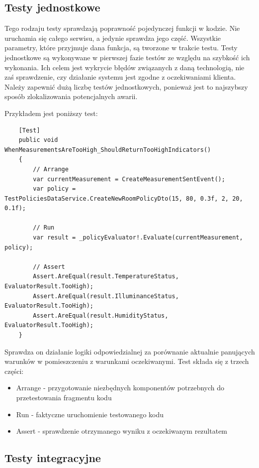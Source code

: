 \documentclass[11pt, a4]{article} %
\begin{document}
\subsection{Testy jednostkowe}

Tego rodzaju testy sprawdzają poprawność pojedynczej funkcji w kodzie. Nie uruchamia 
się całego serwisu, a jedynie sprawdza jego część. Wszystkie parametry, które 
przyjmuje dana funkcja, są tworzone w trakcie testu. Testy jednostkowe są wykonywane 
w pierwszej fazie testów ze względu na szybkość ich wykonania. Ich celem jest wykrycie 
błędów związanych z daną technologią, nie zaś sprawdzenie, czy działanie systemu jest 
zgodne z oczekiwaniami klienta. Należy zapewnić dużą liczbę testów 
jednostkowych, ponieważ jest to najszybszy sposób zlokalizowania potencjalnych awarii.

Przykładem jest poniższy test:

\begin{lstlisting}
    [Test]
    public void WhenMeasurementsAreTooHigh_ShouldReturnTooHighIndicators()
    {
        // Arrange
        var currentMeasurement = CreateMeasurementSentEvent();
        var policy = TestPoliciesDataService.CreateNewRoomPolicyDto(15, 80, 0.3f, 2, 20, 0.1f);

        // Run
        var result = _policyEvaluator!.Evaluate(currentMeasurement, policy);
        
        // Assert
        Assert.AreEqual(result.TemperatureStatus, EvaluatorResult.TooHigh);
        Assert.AreEqual(result.IlluminanceStatus, EvaluatorResult.TooHigh);
        Assert.AreEqual(result.HumidityStatus, EvaluatorResult.TooHigh);
    }
\end{lstlisting}

Sprawdza on działanie logiki odpowiedzialnej za porównanie aktualnie panujących 
warunków w pomieszczeniu z warunkami oczekiwanymi. Test składa się z trzech części:

\begin{itemize} %
    \item Arrange - przygotowanie niezbędnych komponentów potrzebnych do przetestowania 
    fragmentu kodu
    \item Run - faktyczne uruchomienie testowanego kodu
    \item Assert - sprawdzenie otrzymanego wyniku z oczekiwanym rezultatem
\end{itemize}

\subsection{Testy integracyjne}
\end{document}
